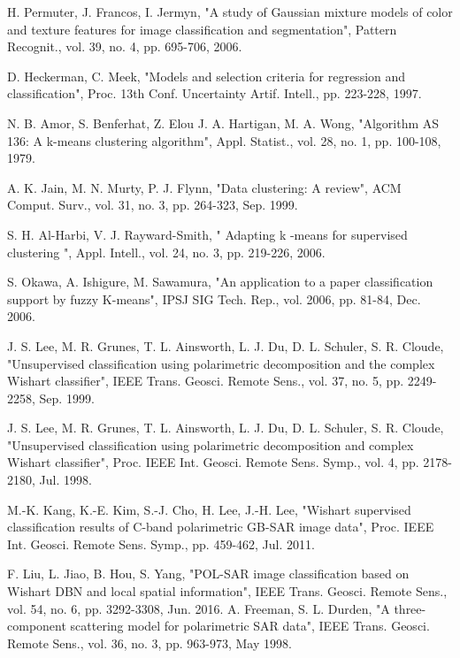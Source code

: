 \documentclass[11pt, a4paper, onecolumn, oneside]{article}
\begin{document}
\begin{thebibliography}{35}
	H. Permuter, J. Francos, I. Jermyn, "A study of Gaussian mixture models of color and texture features for image classification and segmentation", Pattern Recognit., vol. 39, no. 4, pp. 695-706, 2006.

D. Heckerman, C. Meek, "Models and selection criteria for regression and classification", Proc. 13th Conf. Uncertainty Artif. Intell., pp. 223-228, 1997.

N. B. Amor, S. Benferhat, Z. Elou	J. A. Hartigan, M. A. Wong, "Algorithm AS 136: A k-means clustering algorithm", Appl. Statist., vol. 28, no. 1, pp. 100-108, 1979.

A. K. Jain, M. N. Murty, P. J. Flynn, "Data clustering: A review", ACM Comput. Surv., vol. 31, no. 3, pp. 264-323, Sep. 1999.

S. H. Al-Harbi, V. J. Rayward-Smith, " Adapting k -means for supervised clustering ", Appl. Intell., vol. 24, no. 3, pp. 219-226, 2006.

S. Okawa, A. Ishigure, M. Sawamura, "An application to a paper classification support by fuzzy K-means", IPSJ SIG Tech. Rep., vol. 2006, pp. 81-84, Dec. 2006.

	J. S. Lee, M. R. Grunes, T. L. Ainsworth, L. J. Du, D. L. Schuler, S. R. Cloude, "Unsupervised classification using polarimetric decomposition and the complex Wishart classifier", IEEE Trans. Geosci. Remote Sens., vol. 37, no. 5, pp. 2249-2258, Sep. 1999.

 J. S. Lee, M. R. Grunes, T. L. Ainsworth, L. J. Du, D. L. Schuler, S. R. Cloude, "Unsupervised classification using polarimetric decomposition and complex Wishart classifier", Proc. IEEE Int. Geosci. Remote Sens. Symp., vol. 4, pp. 2178-2180, Jul. 1998.

M.-K. Kang, K.-E. Kim, S.-J. Cho, H. Lee, J.-H. Lee, "Wishart supervised classification results of C-band polarimetric GB-SAR image data", Proc. IEEE Int. Geosci. Remote Sens. Symp., pp. 459-462, Jul. 2011.

F. Liu, L. Jiao, B. Hou, S. Yang, "POL-SAR image classification based on Wishart DBN and local spatial information", IEEE Trans. Geosci. Remote Sens., vol. 54, no. 6, pp. 3292-3308, Jun. 2016.
A. Freeman, S. L. Durden, "A three-component scattering model for polarimetric SAR data", IEEE Trans. Geosci. Remote Sens., vol. 36, no. 3, pp. 963-973, May 1998.

\end{thebibliography}
\end{document}
